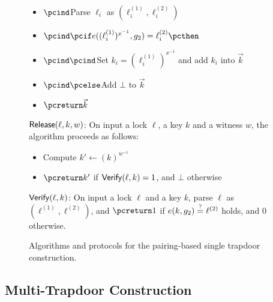 \begin{figure*}[htb]
\begin{center}
{\begin{minipage}[t]{0.75\textwidth}
\begin{itemize}[label=-]
				\item $\pcind$Parse $\ell_i$ as $(\ell_i^{(1)},\ell_i^{(2)})$
				\item $\pcind \pcif e((\ell_i^{(1)})^{x^{-1}}, g_2) = \ell_i^{(2)} \pcthen$
				\item $\pcind \pcind$Set $k_i = (\ell_i^{(1)})^{x^{-1}}$ and add $k_i$ into 
				$\vec{k}$
				\item $\pcind \pcelse$Add $\bot$ to $\vec{k}$
				\item $\pcreturn \vec{k}$
			\end{itemize}
			\underline{$\mathsf{Release}(\ell, k, w)$}: On input a lock $\ell$, a key $k$ and 
			a witness $w$, the algorithm proceeds as follows:
			\begin{itemize}[label=-]
				\item Compute $k' \gets (k)^{w^{-1}}$
				\item $\pcreturn k'$ if $\mathsf{Verify}(\ell, k) = 1$, and $\bot$ otherwise
			\end{itemize}
			\underline{$\mathsf{Verify}(\ell, k)$}: On input a lock $\ell$ and a key $k$, 
			parse $\ell$ as $(\ell^{(1)}, \ell^{(2)})$, and $\pcreturn 1$ if $e(k, g_2) \stackrel{?}{=} 
			\ell^{(2)}$ holds, and 0 otherwise.
		\end{minipage}
	}
	\end{center}
	
	\caption{Algorithms and protocols for the pairing-based single trapdoor construction.}
	\label{fig:single-trapdoor}
\end{figure*}

\subsection{Multi-Trapdoor Construction}


